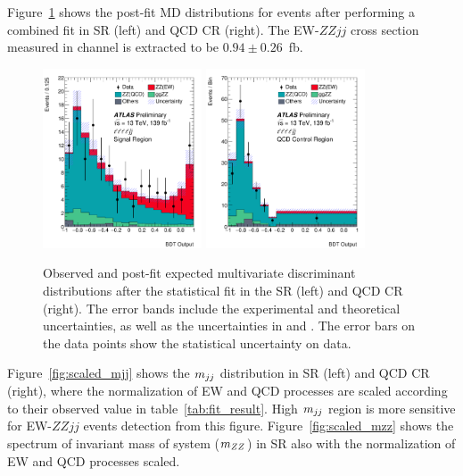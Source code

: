 Figure~\ref{fig:fit_MD} shows the post-fit MD distributions for \llll events after performing a combined fit in SR (left) and QCD CR (right).
The EW-$ZZjj$ cross section measured in \llll channel is extracted to be $0.94 \pm 0.26$~fb.
\begin{figure}[!htbp]
\begin{center}
\includegraphics[width=0.42\textwidth]{figures/VBSZZ/fit/BDT_4l_SR_postFit.pdf}
\includegraphics[width=0.42\textwidth]{figures/VBSZZ/fit/BDT_4l_QCD_CR_postFit.pdf}
\end{center}
\caption{Observed and post-fit expected multivariate discriminant distributions after the statistical fit in the \llll SR (left) and QCD CR (right).
        The error bands include the experimental and theoretical uncertainties,
        as well as the uncertainties in \muEW and \muQCD.
        The error bars on the data points show the statistical uncertainty on data.
        }
\label{fig:fit_MD}
\end{figure}

Figure~\ref{fig:scaled_mjj} shows the $m_{jj}$ distribution in SR (left) and QCD CR (right),
where the normalization of EW and QCD processes are scaled according to their observed value in table~\ref{tab:fit_result}.
High $m_{jj}$ region is more sensitive for EW-$ZZjj$ events detection from this figure.
Figure~\ref{fig:scaled_mzz} shows the spectrum of invariant mass of \llll system ($m_{ZZ}$) in SR
also with the normalization of EW and QCD processes scaled.

